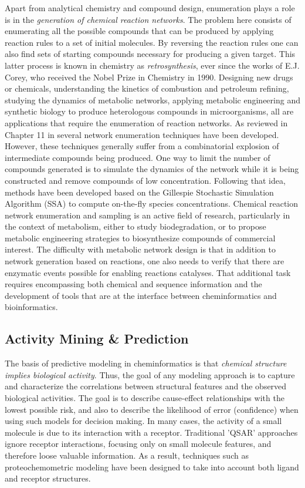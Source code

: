 \documentclass{sig-alternate}
\begin{document}
Apart from analytical chemistry and compound design, enumeration plays a role is in the \emph{generation
  of chemical reaction networks}. The problem here consists of
enumerating all the possible compounds that can be produced by
applying reaction rules to a set of initial molecules. By reversing
the reaction rules one can also find sets of starting compounds
necessary for producing a given target. This latter process is known
in chemistry as \emph{retrosynthesis}, ever since the works of
E.J. Corey, who received the Nobel Prize in Chemistry in
1990. Designing new drugs or chemicals, understanding the kinetics of
combustion and petroleum refining, studying the dynamics of metabolic
networks, applying metabolic engineering and synthetic biology to
produce heterologous compounds in microorganisms, all are applications
that require the enumeration of reaction networks. As reviewed in
Chapter 11 in \cite{faulon2010} several network enumeration techniques
have been developed. However, these techniques generally suffer from a
combinatorial explosion of intermediate compounds being produced. One
way to limit the number of compounds generated is to simulate the
dynamics of the network while it is being constructed and remove
compounds of low concentration. Following that idea, methods have been
developed based on the Gillespie Stochastic Simulation Algorithm (SSA)
to compute on-the-fly species concentrations. Chemical reaction
network enumeration and sampling is an active field of research,
particularly in the context of metabolism, either to study
biodegradation, or to propose metabolic engineering strategies to
biosynthesize compounds of commercial interest. The difficulty with
metabolic network design is that in addition to network generation
based on reactions, one also needs to verify that there are enzymatic
events possible for enabling reactions catalyses. That additional task
requires encompassing both chemical and sequence information and the
development of tools that are at the interface between
cheminformatics and bioinformatics.

\subsection{Activity Mining \& Prediction}
\label{sec:activity-mining}


The basis of predictive modeling in cheminformatics is that
\emph{chemical structure implies biological activity}. Thus, the goal
of any modeling approach is to capture and characterize the
correlations between structural features and the observed biological
activities. The goal is to describe cause-effect relationships with
the lowest possible risk, and also to describe the likelihood of error
(confidence) when using such models for decision making. In many
cases, the activity of a small molecule is due to its interaction with
a receptor. Traditional 'QSAR' approaches ignore receptor interactions,
focusing only on small molecule features, and therefore loose valuable
information. As a result, techniques such as proteochemometric
modeling have been designed to take into account both ligand and
receptor structures.
\end{document}
